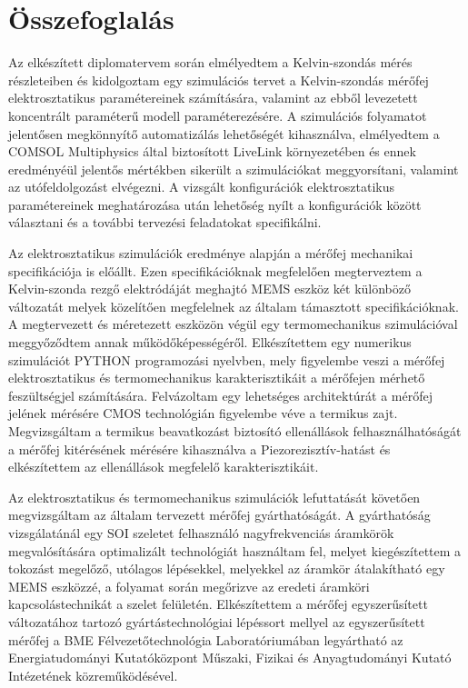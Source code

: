 \chapter{Összefoglalás}

Az elkészített diplomatervem során elmélyedtem a Kelvin-szondás mérés részleteiben és kidolgoztam egy szimulációs tervet a Kelvin-szondás mérőfej elektrosztatikus paramétereinek számítására, valamint az ebből levezetett koncentrált paraméterű modell paraméterezésére. A szimulációs folyamatot jelentősen megkönnyítő automatizálás lehetőségét kihasználva, elmélyedtem a COMSOL Multiphysics által biztosított LiveLink környezetében és ennek eredményéül jelentős mértékben sikerült a szimulációkat meggyorsítani, valamint az utófeldolgozást elvégezni. A vizsgált konfigurációk elektrosztatikus paramétereinek meghatározása után lehetőség nyílt a konfigurációk között választani és a további tervezési feladatokat specifikálni.

Az elektrosztatikus szimulációk eredménye alapján a mérőfej mechanikai specifikációja is előállt. Ezen specifikációknak megfelelően megterveztem a Kelvin-szonda rezgő elektródáját meghajtó MEMS eszköz két különböző változatát melyek közelítően megfelelnek az általam támasztott specifikációknak. A megtervezett és méretezett eszközön végül egy termomechanikus szimulációval meggyőződtem annak működőképességéről. Elkészítettem egy numerikus szimulációt PYTHON programozási nyelvben, mely figyelembe veszi a mérőfej elektrosztatikus és termomechanikus karakterisztikáit a mérőfejen mérhető feszültségjel számítására. Felvázoltam egy lehetséges architektúrát a mérőfej jelének mérésére CMOS technológián figyelembe véve a termikus zajt. Megvizsgáltam a termikus beavatkozást biztosító ellenállások felhasználhatóságát a mérőfej kitérésének mérésére kihasználva a Piezorezisztív-hatást és elkészítettem az ellenállások megfelelő karakterisztikáit.

Az elektrosztatikus és termomechanikus szimulációk lefuttatását követően megvizsgáltam az általam tervezett mérőfej gyárthatóságát. A gyárthatóság vizsgálatánál egy SOI szeletet felhasználó nagyfrekvenciás áramkörök megvalósítására optimalizált technológiát használtam fel, melyet kiegészítettem a tokozást megelőző, utólagos lépésekkel, melyekkel az áramkör átalakítható egy MEMS eszközzé, a folyamat során megőrizve az eredeti áramköri kapcsolástechnikát a szelet felületén. Elkészítettem a mérőfej egyszerűsített változatához tartozó gyártástechnológiai lépéssort mellyel az egyszerűsített mérőfej a BME Félvezetőtechnológia Laboratóriumában legyártható az Energiatudományi Kutatóközpont Műszaki, Fizikai és Anyagtudományi Kutató Intézetének közreműködésével.
